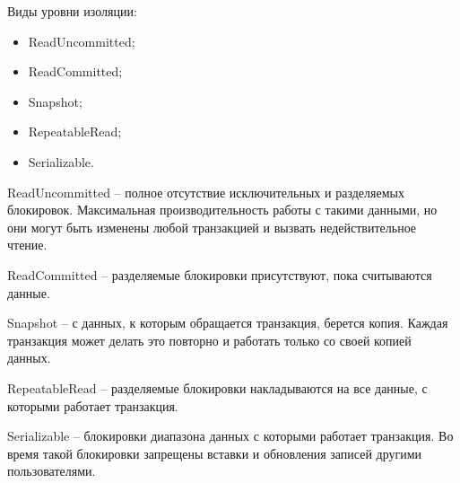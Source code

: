Виды уровни изоляции:
\begin{itemize}
	\item ReadUncommitted;
	\item ReadCommitted;
	\item Snapshot;
	\item RepeatableRead;
	\item Serializable.
\end{itemize}

ReadUncommitted – полное отсутствие исключительных и разделяемых блокировок. Максимальная производительность работы с такими данными, но они могут быть изменены любой транзакцией и вызвать недействительное чтение.

ReadCommitted – разделяемые блокировки присутствуют, пока считываются данные. 

Snapshot – с данных, к которым обращается транзакция, берется копия. Каждая транзакция может делать это повторно и работать только со своей копией данных.

RepeatableRead – разделяемые блокировки накладываются на все данные, с которыми работает транзакция.

Serializable – блокировки диапазона данных с которыми работает транзакция. Во время такой блокировки запрещены вставки и обновления записей другими пользователями.













